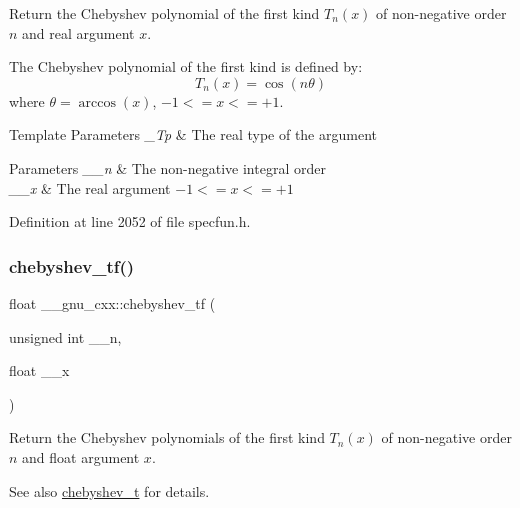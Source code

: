 Return the Chebyshev polynomial of the first kind $ T_n(x) $ of non-\/negative order $ n $ and real argument $ x $.

The Chebyshev polynomial of the first kind is defined by\+: \[ T_n(x) = \cos(n \theta) \] where $ \theta = \arccos(x) $, $ -1 <= x <= +1 $.


\begin{DoxyTemplParams}{Template Parameters}
{\em \+\_\+\+Tp} & The real type of the argument \\
\hline
\end{DoxyTemplParams}

\begin{DoxyParams}{Parameters}
{\em \+\_\+\+\_\+n} & The non-\/negative integral order \\
\hline
{\em \+\_\+\+\_\+x} & The real argument $ -1 <= x <= +1 $ \\
\hline
\end{DoxyParams}


Definition at line 2052 of file specfun.\+h.

\mbox{\label{group__gnu__math__spec__func_gab8cdb55702d9c8b85af4ecc3d8c6a134}} 
\subsubsection{\texorpdfstring{chebyshev\+\_\+tf()}{chebyshev\_tf()}}
{\footnotesize\ttfamily float \+\_\+\+\_\+gnu\+\_\+cxx\+::chebyshev\+\_\+tf (\begin{DoxyParamCaption}\item[{unsigned int}]{\+\_\+\+\_\+n,  }\item[{float}]{\+\_\+\+\_\+x }\end{DoxyParamCaption})\hspace{0.3cm}{\ttfamily [inline]}}

Return the Chebyshev polynomials of the first kind $ T_n(x) $ of non-\/negative order $ n $ and {\ttfamily float} argument $ x $.

\begin{DoxySeeAlso}{See also}
\hyperlink{group__gnu__math__spec__func_ga4d9cae9de13a64ceeb4fb0226f4b7844}{chebyshev\+\_\+t} for details. 
\end{DoxySeeAlso}


